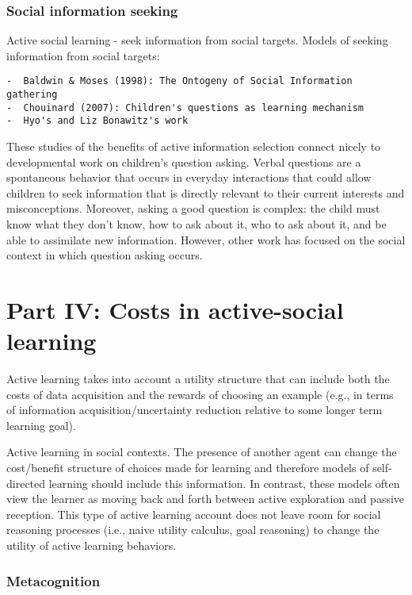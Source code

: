 \documentclass[a4paper,man,apacite,floatsintext]{apa6}
\begin{document}
\subsubsection{Social information
seeking}\label{social-information-seeking}

Active social learning - seek information from social targets. Models of
seeking information from social targets:

\begin{verbatim}
-  Baldwin & Moses (1998): The Ontogeny of Social Information gathering
-  Chouinard (2007): Children's questions as learning mechanism
-  Hyo's and Liz Bonawitz's work
\end{verbatim}

These studies of the benefits of active information selection connect
nicely to developmental work on children's question asking. Verbal
questions are a spontaneous behavior that occurs in everyday
interactions that could allow children to seek information that is
directly relevant to their current interests and misconceptions.
Moreover, asking a good question is complex: the child must know what
they don't know, how to ask about it, who to ask about it, and be able
to assimilate new information. However, other work has focused on the
social context in which question asking occurs.

\section{Part IV: Costs in active-social
learning}\label{part-iv-costs-in-active-social-learning}

Active learning takes into account a utility structure that can include
both the costs of data acquisition and the rewards of choosing an
example (e.g., in terms of information acquisition/uncertainty reduction
relative to some longer term learning goal).

Active learning in social contexts. The presence of another agent can
change the cost/benefit structure of choices made for learning and
therefore models of self-directed learning should include this
information. In contrast, these models often view the learner as moving
back and forth between active exploration and passive reception. This
type of active learning account does not leave room for social reasoning
processes (i.e., naive utility calculus, goal reasoning) to change the
utility of active learning behaviors.

\subsubsection{Metacognition}\label{metacognition}
\end{document}
